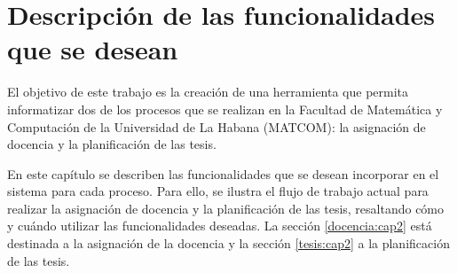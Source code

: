 \chapter{Descripción de las funcionalidades que se desean}\label{chapter:features}
El objetivo de este trabajo es la creación de una herramienta
que permita informatizar dos de los procesos que se realizan en la Facultad de Matemática y
Computación de la Universidad de La Habana (MATCOM): la asignación de docencia y la planificación de las tesis. 

En este capítulo se describen las funcionalidades que se desean incorporar
en el sistema para cada proceso. 
Para ello, se ilustra el flujo de trabajo actual para 
realizar la asignación de docencia y la planificación de las tesis, resaltando 
cómo y cuándo utilizar las funcionalidades deseadas.
La sección \ref{docencia:cap2} está destinada a la asignación de la docencia y 
la sección \ref{tesis:cap2} a la planificación de las tesis.












